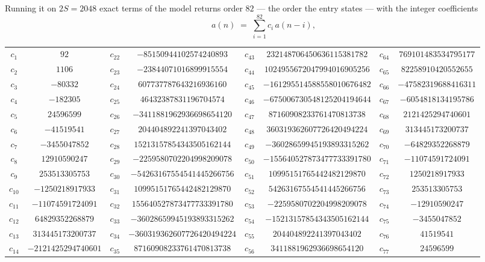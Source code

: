 \documentclass[11pt,a4paper]{article}
\theoremstyle{plain}
\theoremstyle{definition}
\begin{document}
Running it on $2S=2048$ exact terms of the model returns order $82$ --- the order the
entry states --- with the integer coefficients
\[
a(n)\;=\;\sum_{i=1}^{82}c_i\,a(n-i),
\]
\begin{center}\small
\begin{tabular}{cccccccc}
$c_{1}$ & $92$ & $c_{22}$ & $-85150944102574240893$ & $c_{43}$ & $232148706450636115381782$ & $c_{64}$ & $769101483534795177$ \\
$c_{2}$ & $1106$ & $c_{23}$ & $-23844071016899915554$ & $c_{44}$ & $1024955672047994016905256$ & $c_{65}$ & $82258910420552655$ \\
$c_{3}$ & $-80332$ & $c_{24}$ & $607737787643216936160$ & $c_{45}$ & $-161295514588558010676482$ & $c_{66}$ & $-47582319688416311$ \\
$c_{4}$ & $-182305$ & $c_{25}$ & $46432387831196704574$ & $c_{46}$ & $-675006730548125204194644$ & $c_{67}$ & $-6054818134195786$ \\
$c_{5}$ & $24596599$ & $c_{26}$ & $-3411881962936698654120$ & $c_{47}$ & $87160908233761470813738$ & $c_{68}$ & $2121425294740601$ \\
$c_{6}$ & $-41519541$ & $c_{27}$ & $204404892241397043402$ & $c_{48}$ & $360319362607726420494224$ & $c_{69}$ & $313445173200737$ \\
$c_{7}$ & $-3455047852$ & $c_{28}$ & $15213157854343505162144$ & $c_{49}$ & $-36028659945193893315262$ & $c_{70}$ & $-64829352268879$ \\
$c_{8}$ & $12910590247$ & $c_{29}$ & $-2259580702204998209078$ & $c_{50}$ & $-155640527873477733391780$ & $c_{71}$ & $-11074591724091$ \\
$c_{9}$ & $253513305753$ & $c_{30}$ & $-54263167554541445266756$ & $c_{51}$ & $10995151765442482129870$ & $c_{72}$ & $1250218917933$ \\
$c_{10}$ & $-1250218917933$ & $c_{31}$ & $10995151765442482129870$ & $c_{52}$ & $54263167554541445266756$ & $c_{73}$ & $253513305753$ \\
$c_{11}$ & $-11074591724091$ & $c_{32}$ & $155640527873477733391780$ & $c_{53}$ & $-2259580702204998209078$ & $c_{74}$ & $-12910590247$ \\
$c_{12}$ & $64829352268879$ & $c_{33}$ & $-36028659945193893315262$ & $c_{54}$ & $-15213157854343505162144$ & $c_{75}$ & $-3455047852$ \\
$c_{13}$ & $313445173200737$ & $c_{34}$ & $-360319362607726420494224$ & $c_{55}$ & $204404892241397043402$ & $c_{76}$ & $41519541$ \\
$c_{14}$ & $-2121425294740601$ & $c_{35}$ & $87160908233761470813738$ & $c_{56}$ & $3411881962936698654120$ & $c_{77}$ & $24596599$ \\

\end{tabular}
\end{center}
\end{document}
